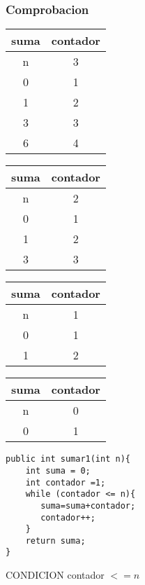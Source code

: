 \documentclass{beamer}
\begin{document}
\begin{frame}[fragile]
\frametitle{Comprobacion}
\begin{footnotesize}
\begin{multicols}{2}
\begin{tabular}{|c|c|}
\hline
suma & contador\\
\hline
\alert{n}&\alert{3}\\
\hline
0 & 1\\
\hline
1 & 2\\
\hline
3 & 3\\
\hline
6 & 4\\
\hline
\end{tabular}
\begin{tabular}{|c|c|}
\hline
suma & contador\\
\hline
\alert{n}&\alert{2}\\
\hline
0 & 1\\
\hline
1 & 2\\
\hline
3 & 3\\
\hline
\end{tabular}
\begin{tabular}{|c|c|}
\hline
suma & contador\\
\hline
\alert{n}&\alert{1}\\
\hline
0 & 1\\
\hline
1 & 2\\
\hline
\end{tabular}

\begin{tabular}{|c|c|}
\hline
suma & contador\\
\hline
\alert{n}&\alert{0}\\
\hline
0 & 1\\
\hline
\end{tabular}
\begin{verbatim}
public int sumar1(int n){
    int suma = 0;
    int contador =1;
    while (contador <= n){
       suma=suma+contador;
       contador++;
    }
    return suma;
}
\end{verbatim}
\end{multicols}
\end{footnotesize}
\begin{center}
\alert{CONDICION contador $<=n$}
\end{center}
\end{frame}
\end{document}
